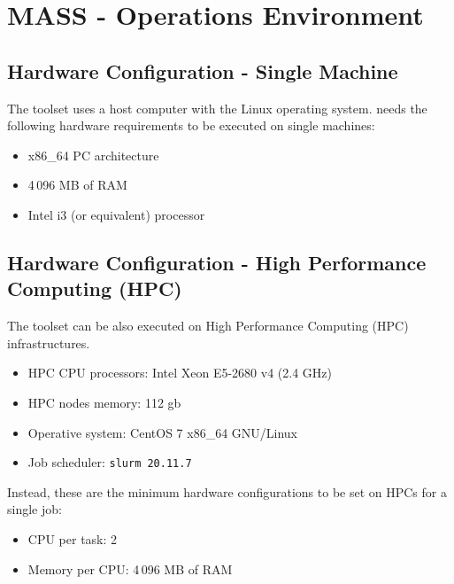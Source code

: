 
\chapter{MASS - Operations Environment}
\label{chapter:operations}

\section{Hardware Configuration - Single Machine}

The \MASS toolset uses a host computer with the Linux operating system. \MASS needs the following hardware requirements to be executed on single machines:

\begin{itemize}
	\item x86\_64 PC architecture
	\item 4\,096 MB of RAM
	\item Intel i3 (or equivalent) processor
\end{itemize}

\section{Hardware Configuration - High Performance Computing (HPC)}

The \MASS toolset can be also executed on High Performance Computing (HPC) infrastructures.  

\begin{itemize}
	\item HPC CPU processors: Intel Xeon E5-2680 v4 (2.4 GHz)
	\item HPC nodes memory: 112 gb
	\item Operative system: CentOS 7 x86\_64 GNU/Linux
	\item Job scheduler: \texttt{slurm 20.11.7}
\end{itemize}

Instead, these are the minimum hardware configurations to be set on HPCs for a single job:

\begin{itemize}
	\item CPU per task: 2
	\item Memory per CPU: 4\,096 MB of RAM
\end{itemize}

